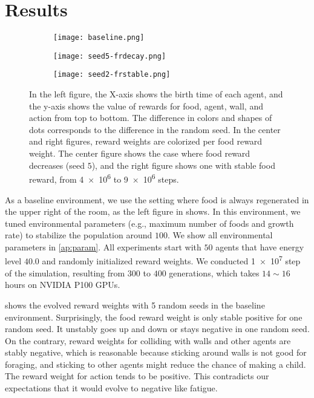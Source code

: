 \section{Results}

\begin{figure}[t]
  \begin{subfigure}[t]{5cm}
    \centering
    \texttt{[image: baseline.png]}
    \label{subfigure:bl}
  \end{subfigure}
  \begin{subfigure}[t]{5cm}
    \centering
    \texttt{[image: seed5-frdecay.png]}
    \label{subfigure:s5}
  \end{subfigure}
  \begin{subfigure}[t]{5cm}
    \centering
    \texttt{[image: seed2-frstable.png]}
    \label{subfigure:s2}
  \end{subfigure}
  \caption{
    In the left figure, the X-axis shows the birth time of each agent, and the y-axis shows the value of rewards for food, agent, wall, and action from top to bottom. The difference in colors and shapes of dots corresponds to the difference in the random seed. In the center and right figures, reward weights are colorized per food reward weight. The center figure shows the case where food reward decreases (seed $5$), and the right figure shows one with stable food reward,  from \num{4e6} to \num{9e6} steps.
  }\label{figure:baseline-result}
\end{figure}

As a baseline environment, we use the setting where food is always regenerated in the upper right of the room, as the left figure in  shows. In this environment, we tuned environmental parameters (e.g., maximum number of foods and growth rate) to stabilize the population around $100$. We show all environmental parameters in \cref{ap:param}. All experiments start with $50$ agents that have energy level $40.0$ and randomly initialized reward weights. We conducted \num{1e7} step of the simulation, resulting from $300$ to $400$ generations, which takes $14\sim16$ hours on NVIDIA P100 GPUs.

 shows the evolved reward weights with 5 random seeds in the baseline environment. Surprisingly, the food reward weight is only stable positive for one random seed. It unstably goes up and down or stays negative in one random seed. On the contrary, reward weights for colliding with walls and other agents are stably negative, which is reasonable because sticking around walls is not good for foraging, and sticking to other agents might reduce the chance of making a child. The reward weight for action tends to be positive. This contradicts our expectations that it would evolve to negative like fatigue.

